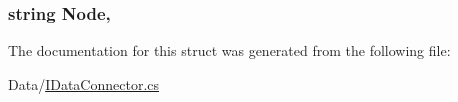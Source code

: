 \subsubsection[{Node}]{\setlength{\rightskip}{0pt plus 5cm}string Node\hspace{0.3cm}{\ttfamily [get]}, {\ttfamily [set]}}\label{structOTA_1_1Data_1_1PermissionNode_ad44054822436f80660a4b86199b49fd3}


The documentation for this struct was generated from the following file\+:\begin{DoxyCompactItemize}
\item 
Data/\hyperlink{IDataConnector_8cs}{I\+Data\+Connector.\+cs}\end{DoxyCompactItemize}
